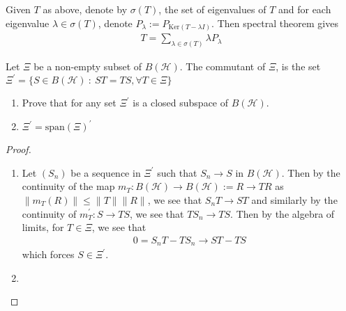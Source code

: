 

Given $T$ as above, denote by $\sigma(T)$, the set of eigenvalues of
$T$ and  for each eigenvalue $ \lambda \in \sigma(T)$, denote
$P_\lambda:= P_{\textrm{Ker}(T- \lambda I)}$. Then spectral theorem gives
\begin{align*}
  T = \sum_{\lambda \in  \sigma(T)}  \lambda P_\lambda
\end{align*}


\begin{definition}
  Let $\Xi$ be a non-empty subset of $B(\mathcal{H})$. The commutant
  of $\Xi$, is the set $\Xi^\prime = \{ S \in B(\mathcal{H})  \ : \    ST
  = TS, \forall T \in \Xi \}$
\end{definition}

\begin{exercise}
  \begin{enumerate}
    \item  Prove that for any set $\Xi^\prime$ is a closed subspace
      of $B(\mathcal{H})$.
    \item $\Xi^\prime = \textrm{span}(\Xi)^\prime$
  \end{enumerate}
\end{exercise}
\begin{proof}
  \begin{enumerate}[label=(\arabic*)]
    \item Let $(S_n)$ be a sequence in $\Xi^\prime$ such that $S_n
      \to S$ in $ B(\mathcal{H})$. Then by the continuity of the map
      $m_T: B(\mathcal{H}) \to B(\mathcal{H}):= R \to TR$ as $
      \|m_T(R)\| \le \|T\| \|R\|$, we see that $S_nT \to ST$ and
      similarly by the continuity of $m^\prime_T: S \to TS$, we see that
      $TS_n \to TS$. Then by the algebra of limits, for $ T \in \Xi$,
      we see that
      \begin{align*}
        0 = S_nT - TS_n \to ST - TS
      \end{align*}
      which forces $S \in \Xi^\prime$.
    \item
  \end{enumerate}
\end{proof}

